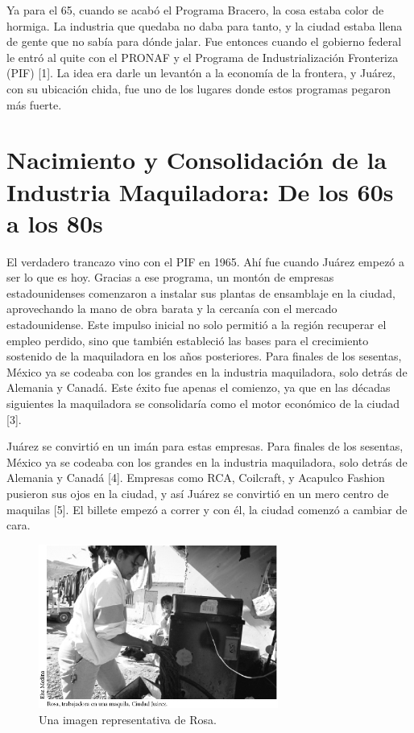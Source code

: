 Ya para el 65, cuando se acabó el Programa Bracero, la cosa estaba color de hormiga. La industria que quedaba no daba para tanto, y la ciudad estaba llena de gente que no sabía para dónde jalar. Fue entonces cuando el gobierno federal le entró al quite con el PRONAF y el Programa de Industrialización Fronteriza (PIF) [1]. La idea era darle un levantón a la economía de la frontera, y Juárez, con su ubicación chida, fue uno de los lugares donde estos programas pegaron más fuerte.

\section{Nacimiento y Consolidación de la Industria Maquiladora: De los 60s a los 80s}

El verdadero trancazo vino con el PIF en 1965. Ahí fue cuando Juárez empezó a ser lo que es hoy. Gracias a ese programa, un montón de empresas estadounidenses comenzaron a instalar sus plantas de ensamblaje en la ciudad, aprovechando la mano de obra barata y la cercanía con el mercado estadounidense. Este impulso inicial no solo permitió a la región recuperar el empleo perdido, sino que también estableció las bases para el crecimiento sostenido de la maquiladora en los años posteriores. Para finales de los sesentas, México ya se codeaba con los grandes en la industria maquiladora, solo detrás de Alemania y Canadá. Este éxito fue apenas el comienzo, ya que en las décadas siguientes la maquiladora se consolidaría como el motor económico de la ciudad [3].

Juárez se convirtió en un imán para estas empresas. Para finales de los sesentas, México ya se codeaba con los grandes en la industria maquiladora, solo detrás de Alemania y Canadá [4]. Empresas como RCA, Coilcraft, y Acapulco Fashion pusieron sus ojos en la ciudad, y así Juárez se convirtió en un mero centro de maquilas [5]. El billete empezó a correr y con él, la ciudad comenzó a cambiar de cara.

\begin{figure}[h]
    \centering
    \includegraphics[width=0.7\textwidth]{img/Rosa.jpg}
    \caption{Una imagen representativa de Rosa.}
    \label{fig:rosa}
\end{figure}

